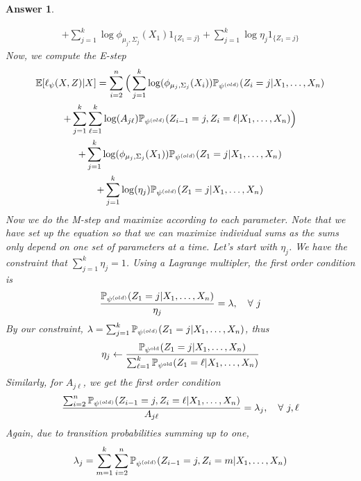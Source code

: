 \documentclass[12pt]{article}
\theoremstyle{colon}
\newtheorem*{answer}{Answer}
\begin{document}
\begin{answer}
\begin{enumerate}[label=\arabic*)]
\begin{gather*}
        + \sum_{j=1}^k \log \phi_{\mu_j, \Sigma_j}(X_1) 1_{\{ Z_1 = j \}} + \sum_{j=1}^k \log \eta_j 1_{\{Z_1 = j\}}
      \end{gather*}
      Now, we compute the E-step
      \begin{gather*}
        \mathbb{E} [\ell_{\psi} (X,Z) | X] = \sum_{i=2}^n \Big( \sum_{j=1}^k \log (\phi_{\mu_j, \Sigma_j}(X_i)) \mathbb{P}_{\psi^{(old)}} (Z_i = j | X_1, \mathellipsis, X_n ) \\
        + \sum_{j=1}^k \sum_{\ell=1}^k \log (A_{j \ell}) \mathbb{P}_{\psi^{(old)}} (Z_{i-1} = j, Z_i = \ell | X_1, \mathellipsis, X_n ) \Big) \\
        + \sum_{j=1}^k \log (\phi_{\mu_j, \Sigma_j}(X_1)) \mathbb{P}_{\psi^{(old)}} (Z_1 = j | X_1, \mathellipsis, X_n ) \\
        + \sum_{j=1}^k \log (\eta_j) \mathbb{P}_{\psi^{(old)}} (Z_1 = j | X_1, \mathellipsis, X_n )
      \end{gather*}
      Now we do the M-step and maximize according to each parameter. Note that we have set up the equation so that we can maximize individual sums as the sums only depend on one set of parameters at a time. Let's start with $\eta_j$. We have the constraint that $\sum_{j=1}^k \eta_j = 1$. Using a Lagrange multipler, the first order condition is
      \begin{gather*}
        \frac{\mathbb{P}_{\psi^{(old)}} (Z_1 = j | X_1, \mathellipsis, X_n )}{\eta_j} = \lambda, \quad \forall \ j
      \end{gather*}
      By our constraint, $\lambda = \sum_{j = 1}^k \mathbb{P}_{\psi^{(old)}} (Z_1 = j | X_1, \mathellipsis, X_n )$, thus
      \begin{gather*}
        \eta_j \leftarrow \frac{\mathbb{P}_{\psi^{\text{old}}}(Z_1 = j | X_1, \mathellipsis, X_n)}{\sum_{\ell = 1}^k \mathbb{P}_{\psi^{\text{old}}}(Z_1 = \ell | X_1, \mathellipsis, X_n)}
      \end{gather*}
      Similarly, for $A_{j \ell}$, we get the first order condition
      \begin{gather*}
        \frac{\sum_{i=2}^n \mathbb{P}_{\psi^{(old)}} (Z_{i-1} = j , Z_i = \ell| X_1, \mathellipsis, X_n )}{A_{j \ell}} = \lambda_j, \quad \forall \ j, \ell
      \end{gather*}
      Again, due to transition probabilities summing up to one,
      \begin{gather*}
        \lambda_j = \sum_{m=1}^k \sum_{i=2}^n \mathbb{P}_{\psi^{(old)}} (Z_{i-1} = j , Z_i = m | X_1, \mathellipsis, X_n )

\end{gather*}
\end{enumerate}
\end{answer}
\end{document}
